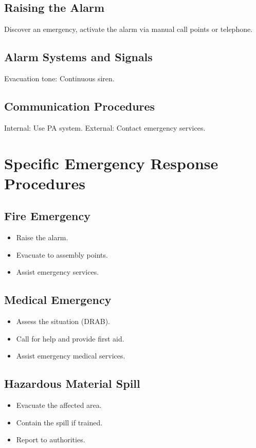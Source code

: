 \documentclass[12pt]{article}
\begin{document}
\subsection{Raising the Alarm}
Discover an emergency, activate the alarm via manual call points or telephone.

\subsection{Alarm Systems and Signals}
Evacuation tone: Continuous siren.

\subsection{Communication Procedures}
Internal: Use PA system. External: Contact emergency services.

\section{Specific Emergency Response Procedures}

\subsection{Fire Emergency}
\begin{itemize}
    \item Raise the alarm.
    \item Evacuate to assembly points.
    \item Assist emergency services.
\end{itemize}

\subsection{Medical Emergency}
\begin{itemize}
    \item Assess the situation (DRAB).
    \item Call for help and provide first aid.
    \item Assist emergency medical services.
\end{itemize}

\subsection{Hazardous Material Spill}
\begin{itemize}
    \item Evacuate the affected area.
    \item Contain the spill if trained.
    \item Report to authorities.
\end{itemize}
\end{document}
